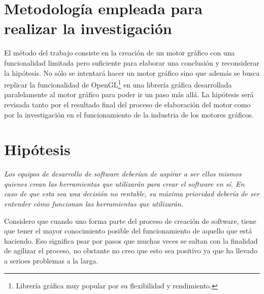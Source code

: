 \section{Metodología empleada para realizar la investigación}
El método del trabajo consiste en la creación de un motor gráfico con una funcionalidad limitada pero suficiente para elaborar una conclusión y reconsiderar la hipótesis. No sólo se intentará hacer un motor gráfico sino que además se busca replicar la funcionalidad de OpenGL\footnote{Librería gráfica muy popular por su flexibilidad y rendimiento.} en una librería gráfica desarrollada paralelamente al motor gráfico para poder ir un paso más allá. La hipótesis será revisada tanto por el resultado final del proceso de elaboración del motor como por la investigación en el funcionamiento de la industria de los motores gráficos.

\section{Hipótesis}
\textit{Los equipos de desarrollo de software deberían de aspirar a ser ellos mismos quienes crean las herramientas que utilizarán para crear el software en sí. En caso de que esta sea una decisión no rentable, su máxima prioridad debería de ser entender cómo funcionan las herramientas que utilizarán.}


Considero que cuando uno forma parte del proceso de creación de software, tiene que tener el mayor conocimiento posible del funcionamiento de aquello que está haciendo. Eso significa psar por pasos que muchas veces se saltan con la finalidad de agilizar el proceso, no obstante no creo que esto sea positivo ya que ha llevado a serioes problemas a la larga.
